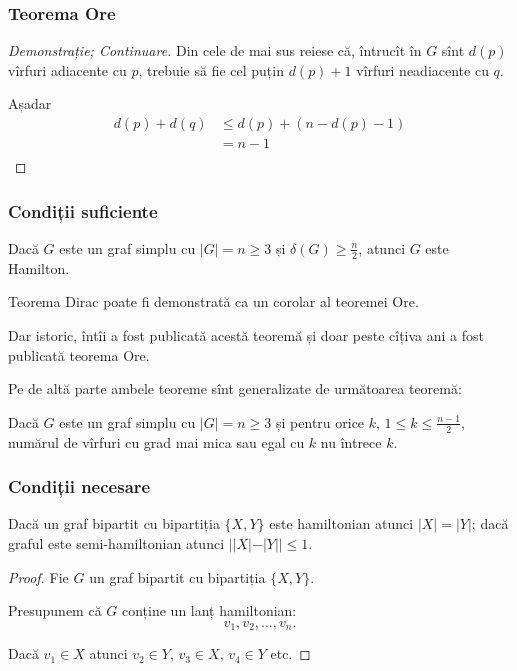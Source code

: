 \begin{frame}
  \frametitle{Teorema Ore}

\begin{proof}[Demonstrație; Continuare]
Din cele de mai sus reiese că, întrucît în $G$ sînt $d(p)$ vîrfuri adiacente cu $p$, trebuie să fie cel puțin $d(p)+1$ vîrfuri neadiacente cu $q$. 
\pause

Așadar
\[
  \begin{array}{ll}
    d(p)+d(q)	&\leq	d(p) + (n - d(p) - 1)\\
		&=	n-1\\
  \end{array}
\]

\end{proof}

\end{frame}

\begin{frame}
  \frametitle{Condiții suficiente}

\begin{theorem}[Dirac]
Dacă $G$ este un graf simplu cu $|G| = n \geq 3$ și $\delta(G)\geq\frac{n}{2}$, 
atunci $G$ este Hamilton.
\end{theorem}
\pause

Teorema Dirac poate fi demonstrată ca un corolar al teoremei Ore.

Dar istoric, întîi a fost publicată acestă teoremă și doar peste cîțiva ani a fost publicată teorema Ore. 
\pause

Pe de altă parte ambele teoreme sînt generalizate de următoarea teoremă:
\pause

\begin{theorem}[Pos\' a]
Dacă $G$ este un graf simplu cu $|G| = n \geq 3$ și pentru orice $k$, $1\leq k\leq \frac{n-1}{2}$, numărul de vîrfuri cu grad mai mica sau egal cu $k$ nu întrece $k$.
\end{theorem}



\end{frame}

\begin{frame}
  \frametitle{Condiții necesare}

\begin{theorem}
Dacă un graf bipartit cu bipartiția $\{X,Y\}$ este hamiltonian atunci $|X|=|Y|$; 
dacă graful este semi-hamiltonian atunci $||X|-|Y||\leq 1$.
\end{theorem}
\pause

\begin{proof}
Fie $G$ un graf bipartit cu bipartiția $\{X,Y\}$.
\pause

Presupunem că $G$ conține un lanț hamiltonian:
\[
  v_1,v_2,...,v_n.
\]
\pause
 
Dacă $v_1\in X$ atunci $v_2\in Y$, $v_3\in X$, $v_4\in Y$ etc.

\end{proof}


\end{frame}

